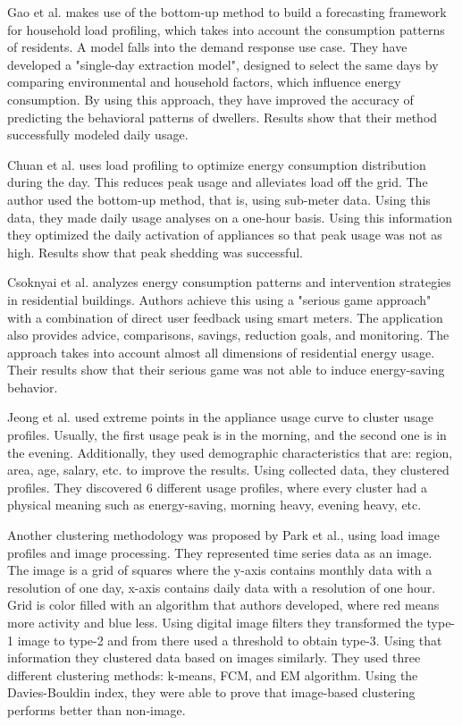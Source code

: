 Gao et al.\cite{Gao2018} makes use of the bottom-up method to build a forecasting framework for household
load profiling, which takes into account the consumption patterns of residents. 
A model falls into the demand response use case.
They have developed a "single-day extraction model", designed to select the same days by comparing environmental and household factors, which influence energy consumption.
By using this approach, they have improved the accuracy of predicting the behavioral patterns of dwellers. 
Results show that their method successfully modeled daily usage.

Chuan et al.\cite{Chuan2014} uses load profiling to optimize energy consumption distribution during the day.
This reduces peak usage and alleviates load off the grid. The author used the bottom-up method, that is, using sub-meter data.
Using this data, they made daily usage analyses on a one-hour basis. Using this information they optimized the daily activation of appliances
so that peak usage was not as high. Results show that peak shedding was successful. 

Csoknyai et al.\cite{Csoknyai2019} analyzes energy consumption patterns and intervention strategies in residential buildings.
Authors achieve this using a "serious game approach" with a combination of direct user feedback using smart meters. 
The application also provides advice, comparisons, savings, reduction goals, and monitoring.
The approach takes into account almost all dimensions of residential energy usage. Their results show that their serious game was not
able to induce energy-saving behavior.

Jeong et al.\cite{Jeong2021} used extreme points in the appliance usage curve to cluster usage profiles.
Usually, the first usage peak is in the morning, and the second one is in the evening. 
Additionally, they used demographic characteristics that are: region, area, age, salary, etc. to improve the results.
Using collected data, they clustered profiles. They discovered 6 different usage profiles, 
where every cluster had a physical meaning such as energy-saving, morning heavy, evening heavy, etc.

Another clustering methodology was proposed by Park et al.\cite{Park2019}, using load image profiles and image processing.
They represented time series data as an image. The image is a grid of squares where the y-axis contains monthly data with a resolution of one day,
x-axis contains daily data with a resolution of one hour. Grid is color filled with an algorithm that authors developed,
where red means more activity and blue less. Using digital image filters they transformed the type-1 image to type-2 and from there
used a threshold to obtain type-3. Using that information they clustered data based on images similarly. They used three different 
clustering methods: k-means, FCM, and EM algorithm. Using the Davies-Bouldin index, they were able to prove that image-based clustering performs better than non-image.

